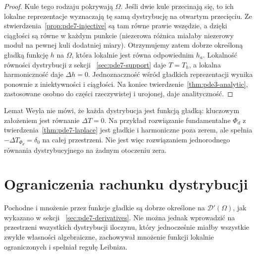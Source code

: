 \begin{proof}
Kule tego rodzaju pokrywają $\Omega$. Jeśli dwie
kule przecinają się, to ich lokalne reprezentacje
wyznaczają tę samą dystrybucję na otwartym
przecięciu. Ze stwierdzenia~\ref{prop:pde7-injective}
są tam równe prawie wszędzie, a dzięki ciągłości
są równe w każdym punkcie (niezerowa różnica
miałaby niezerowy moduł na pewnej kuli
dodatniej miary).
Otrzymujemy zatem dobrze określoną gładką
funkcję $h$ na $\Omega$, która lokalnie jest
równa odpowiednim $h_a$.
Lokalność równości dystrybucji z sekcji
~\ref{sec:pde7-support} daje $T=T_h$,
a lokalna harmoniczność daje $\Delta h=0$.
Jednoznaczność wśród gładkich reprezentacji
wynika ponownie z iniektywności i ciągłości.
Na koniec twierdzenie~\ref{thm:pde3-analytic},
zastosowane osobno do części rzeczywistej
i urojonej, daje analityczność.
\end{proof}

\begin{uwaga}
Lemat Weyla nie mówi, że każda dystrybucja jest
funkcją gładką: kluczowym założeniem jest
równanie $\Delta T=0$.
Na przykład rozwiązanie fundamentalne $\Phi_d$
z twierdzenia~\ref{thm:pde7-laplace} jest gładkie
i harmoniczne poza zerem, ale spełnia
$-\Delta T_{\Phi_d}=\delta_0$ na całej przestrzeni.
Nie jest więc rozwiązaniem jednorodnego równania
dystrybucyjnego na żadnym otoczeniu zera.
\end{uwaga}

\section{Ograniczenia rachunku dystrybucji}
\label{sec:pde7-limits}

Pochodne i mnożenie przez funkcje gładkie są dobrze określone
na $\mathcal D'(\Omega)$, jak wykazano w sekcji
~\ref{sec:pde7-derivatives}. Nie można jednak wprowadzić
na przestrzeni wszystkich dystrybucji iloczynu, który
jednocześnie miałby wszystkie zwykłe własności
algebraiczne, zachowywał mnożenie funkcji lokalnie
ograniczonych i spełniał regułę Leibniza.

